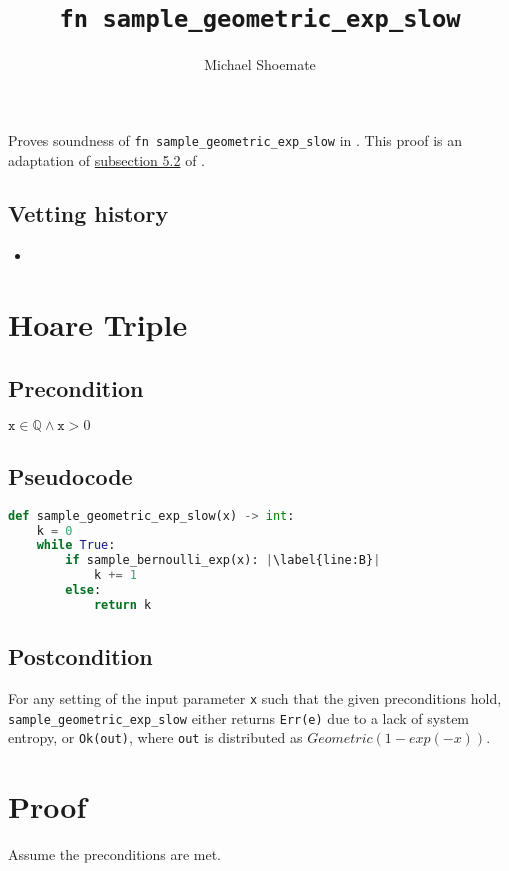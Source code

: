 \documentclass{article}
\title{\texttt{fn sample\_geometric\_exp\_slow}}
\author{Michael Shoemate}
\begin{document}
\maketitle

\contrib
Proves soundness of \texttt{fn sample\_geometric\_exp\_slow} in .
This proof is an adaptation of \href{https://arxiv.org/pdf/2004.00010.pdf#subsection.5.2}{subsection 5.2} of \cite{CKS20}.

\subsection*{Vetting history}
\begin{itemize}
    \item {}
\end{itemize}

\section{Hoare Triple}
\subsection*{Precondition}
$\texttt{x} \in \mathbb{Q} \land \texttt{x} > 0$

\subsection*{Pseudocode}        
\begin{lstlisting}[language=Python, escapechar=|]
def sample_geometric_exp_slow(x) -> int:
    k = 0
    while True:
        if sample_bernoulli_exp(x): |\label{line:B}|
            k += 1
        else:
            return k
\end{lstlisting}

\subsection*{Postcondition}\label{postcondition}
For any setting of the input parameter \texttt{x} such that the given preconditions hold, \\
\texttt{sample\_geometric\_exp\_slow} either returns \texttt{Err(e)} due to a lack of system entropy,
or \texttt{Ok(out)}, where \texttt{out} is distributed as $Geometric(1 - exp(-x))$.

\section{Proof}
Assume the preconditions are met.
\end{document}
